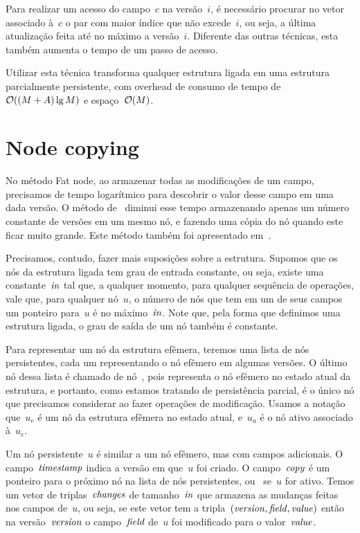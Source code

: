 \documentclass[../../main.tex]{subfiles}
\begin{document}
Para realizar um acesso do campo~$c$ na versão~$i$, é necessário procurar no vetor associado à~$c$ o par com maior índice que não excede~$i$, ou seja, a última atualização feita até no máximo a versão~$i$. Diferente das outras técnicas, esta também aumenta o tempo de um passo de acesso.

Utilizar esta técnica transforma qualquer estrutura ligada em uma estrutura parcialmente persistente, com overhead de consumo de tempo de~$\mathcal{O}((M+A) \lg{M})$ e espaço~$\mathcal{O}(M)$.

\section{Node copying}

No método Fat node, ao armazenar todas as modificações de um campo, precisamos de tempo logarítmico para descobrir o valor desse campo em uma dada versão. O método de~ diminui esse tempo armazenando apenas um número constante de versões em um mesmo nó, e fazendo uma cópia do nó quando este ficar muito grande. Este método também foi apresentado em~\cite{DriscollSST1989}.

Precisamos, contudo, fazer mais suposições sobre a estrutura. Supomos que os nós da estrutura ligada tem grau de entrada constante, ou seja, existe uma constante~$\mathit{in}$ tal que, a qualquer momento, para qualquer sequência de operações, vale que, para qualquer nó~$u$, o número de nós que tem em um de seus campos um ponteiro para~$u$ é no máximo~$\mathit{in}$. Note que, pela forma que definimos uma estrutura ligada, o grau de saída de um nó também é constante.

Para representar um nó da estrutura efêmera, teremos uma lista de nós persistentes, cada um representando o nó efêmero em algumas versões. O último nó dessa lista é chamado de nó~, pois representa o nó efêmero no estado atual da estrutura, e portanto, como estamos tratando de persistência parcial, é o único nó que precisamos considerar ao fazer operações de modificação. Usamos a notação que~$u_e$ é um nó da estrutura efêmera no estado atual, e~$u_a$ é o nó ativo associado à~$u_e$.

Um nó persistente~$u$ é similar a um nó efêmero, mas com campos adicionais. O campo~$\mathit{timestamp}$ indica a versão em que~$u$ foi criado. O campo~$\mathit{copy}$ é um ponteiro para o próximo nó na lista de nós persistentes, ou~ se~$u$ for ativo. Temos um vetor de triplas~$\mathit{changes}$ de tamanho~$\mathit{in}$ que armazena as mudanças feitas nos campos de~$u$, ou seja, se este vetor tem a tripla~$(\mathit{version}, \mathit{field}, \mathit{value})$ então na versão~$\mathit{version}$ o campo~$\mathit{field}$ de~$u$ foi modificado para o valor~$\mathit{value}$.
\end{document}
